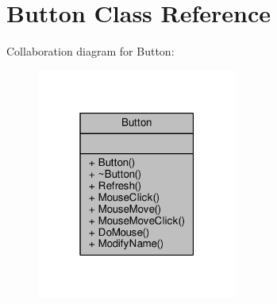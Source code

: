 \hypertarget{classButton}{}\section{Button Class Reference}
\label{classButton}


Collaboration diagram for Button\+:
\nopagebreak
\begin{figure}[H]
\begin{center}
\leavevmode
\includegraphics[width=187pt]{d6/dbf/classButton__coll__graph}
\end{center}
\end{figure}
